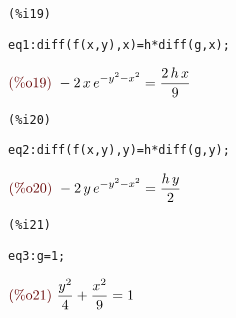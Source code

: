 \documentclass[12pt]{article}
\begin{document}
\noindent
\begin{minipage}[t]{8ex}{\color{red}\bf
\begin{verbatim}
(%i19) 
\end{verbatim}}
\end{minipage}
\begin{minipage}[t]{\textwidth}{\color{blue}
\begin{verbatim}
eq1:diff(f(x,y),x)=h*diff(g,x);
\end{verbatim}}
\end{minipage}
\begin{math}\displaystyle
\parbox{8ex}{\color{labelcolor}(\%o19) }
-2\,x\,{e}^{-{y}^{2}-{x}^{2}}=\frac{2\,h\,x}{9}
\end{math}


\noindent
\begin{minipage}[t]{8ex}{\color{red}\bf
\begin{verbatim}
(%i20) 
\end{verbatim}}
\end{minipage}
\begin{minipage}[t]{\textwidth}{\color{blue}
\begin{verbatim}
eq2:diff(f(x,y),y)=h*diff(g,y);
\end{verbatim}}
\end{minipage}
\begin{math}\displaystyle
\parbox{8ex}{\color{labelcolor}(\%o20) }
-2\,y\,{e}^{-{y}^{2}-{x}^{2}}=\frac{h\,y}{2}
\end{math}


\noindent
\begin{minipage}[t]{8ex}{\color{red}\bf
\begin{verbatim}
(%i21) 
\end{verbatim}}
\end{minipage}
\begin{minipage}[t]{\textwidth}{\color{blue}
\begin{verbatim}
eq3:g=1;
\end{verbatim}}
\end{minipage}
\begin{math}\displaystyle
\parbox{8ex}{\color{labelcolor}(\%o21) }
\frac{{y}^{2}}{4}+\frac{{x}^{2}}{9}=1
\end{math}
\end{document}
